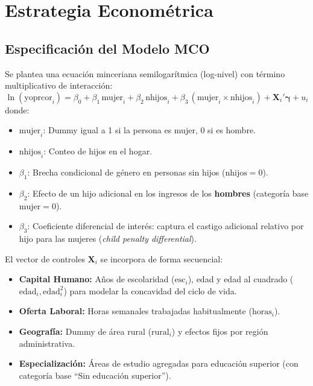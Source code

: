 \documentclass[11pt,a4paper]{article}
\begin{document}
\section{Estrategia Econométrica}
\subsection{Especificación del Modelo MCO}
Se plantea una ecuación minceriana semilogarítmica (log-nivel) con término multiplicativo de interacción:
\begin{equation}
    \ln(\text{yoprcor}_i) = \beta_0 + \beta_1\,\text{mujer}_i + \beta_2\,\text{nhijos}_i + \beta_3\,(\text{mujer}_i \times \text{nhijos}_i) + \mathbf{X}_i'\boldsymbol{\gamma} + u_i
    \label{eq:mco}
\end{equation}
donde:
\begin{itemize}
    \item $\text{mujer}_i$: Dummy igual a 1 si la persona es mujer, 0 si es hombre.
    \item $\text{nhijos}_i$: Conteo de hijos en el hogar.
    \item $\beta_1$: Brecha condicional de género en personas sin hijos ($\text{nhijos} = 0$).
    \item $\beta_2$: Efecto de un hijo adicional en los ingresos de los \textbf{hombres} (categoría base $\text{mujer} = 0$).
    \item $\beta_3$: Coeficiente diferencial de interés: captura el castigo adicional relativo por hijo para las mujeres (\textit{child penalty differential}).
\end{itemize}

El vector de controles $\mathbf{X}_i$ se incorpora de forma secuencial:
\begin{itemize}
    \item \textbf{Capital Humano:} Años de escolaridad ($\text{esc}_i$), edad y edad al cuadrado ($\text{edad}_i, \text{edad}_i^2$) para modelar la concavidad del ciclo de vida.
    \item \textbf{Oferta Laboral:} Horas semanales trabajadas habitualmente ($\text{horas}_i$).
    \item \textbf{Geografía:} Dummy de área rural ($\text{rural}_i$) y efectos fijos por región administrativa.
    \item \textbf{Especialización:} Áreas de estudio agregadas para educación superior (con categoría base ``Sin educación superior'').
\end{itemize}
\end{document}
